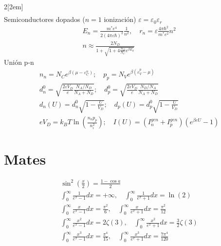 \documentclass[leqno]{article}
\begin{document}
\begin{multicols}{2}[\columnsep2em]
\begin{align*}
\end{align*}
Semiconductores dopados ($n=1$ ionización) $\varepsilon = \varepsilon _0\varepsilon_r$
\begin{align*}
  &E_n = \frac{m^*e^4}{2(4\pi \varepsilon \hbar )^2} \frac{1}{n^2}, \quad r_n = \varepsilon \frac{4\pi \hbar ^2}{m^*e^2}n^2\\
  &n \approx \frac{2N_D}{1+\sqrt{1+4 \frac{N_D}{N_C} e ^{\beta E_d} }} 
\end{align*}
Unión p-n
\begin{align*}
  &n_n = N_C e ^{\beta (\mu -\varepsilon _C^n)}; \quad p_p = N_V e ^{\beta (\varepsilon _V^p-\mu )}\\
  &d^0_n = \sqrt{ \frac{2\varepsilon V_D}{e} \frac{N_A / N_D}{N_A+N_D}}; \quad d_p^0 = \sqrt{\frac{2\varepsilon V_D}{e}\frac{N_D / N_A}{N_A+N_D}} \\
  & d_n(U) = d_n^0 \sqrt{1- \frac{U}{V_D}}; \quad d_p(U) = d_p^0 \sqrt{1- \frac{U}{V_D}}\\
  &eV_D=k_BT\ln\left( \frac{n_np_p}{n^2_i}\right); \quad I(U) = (I_n ^{gen} +I_p ^{gen})(e ^{\beta eU}-1)
\end{align*}




\section{Mates}
\begin{align*}
&\sin^2 \left(\frac{x}{2}\right) = \frac{1-\cos a}{2}\\
&\int_0^\infty \frac{1}{e^x-1}dx = +\infty, \quad \int_0^\infty \frac{1}{e^x+1}dx = \ln(2)\\
&\int_0^\infty \frac{x}{e^x-1}dx = \frac{\pi^2}{6}, \quad \int_0^\infty \frac{x}{e^x+1}dx = \frac{\pi^2}{12} \\
&\int_0^\infty \frac{x^2}{e^x-1}dx = 2\zeta(3), \quad \int_0^\infty \frac{x^2}{e^x+1}dx = \frac{3}{2}\zeta(3)\\
&\int_0^\infty \frac{x^3}{e^x-1}dx = \frac{\pi^4}{15}, \quad \int_0^\infty \frac{x^3}{e^x+1}dx = \frac{7\pi^4}{120} 
\end{align*}

\end{multicols}
\end{document}
